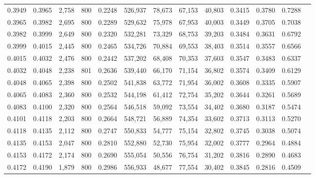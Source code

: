 \begin{tabular}{rrrrrrrrrrrrr}
0.3949 & 0.3965 &  2,758 &   800 &                                     0.2248 & 526,937 &  78,673 &  67,153 &  40,803 & 0.3415 & 0.3780 & 0.7288 \\
0.3965 & 0.3982 &  2,695 &   800 &                                     0.2289 & 529,632 &  75,978 &  67,953 &  40,003 & 0.3449 & 0.3705 & 0.7038 \\
0.3982 & 0.3999 &  2,649 &   800 &                                     0.2320 & 532,281 &  73,329 &  68,753 &  39,203 & 0.3484 & 0.3631 & 0.6792 \\
0.3999 & 0.4015 &  2,445 &   800 &                                     0.2465 & 534,726 &  70,884 &  69,553 &  38,403 & 0.3514 & 0.3557 & 0.6566 \\
0.4015 & 0.4032 &  2,476 &   800 &                                     0.2442 & 537,202 &  68,408 &  70,353 &  37,603 & 0.3547 & 0.3483 & 0.6337 \\
0.4032 & 0.4048 &  2,238 &   801 &                                     0.2636 & 539,440 &  66,170 &  71,154 &  36,802 & 0.3574 & 0.3409 & 0.6129 \\
0.4048 & 0.4065 &  2,398 &   800 &                                     0.2502 & 541,838 &  63,772 &  71,954 &  36,002 & 0.3608 & 0.3335 & 0.5907 \\
0.4065 & 0.4083 &  2,360 &   800 &                                     0.2532 & 544,198 &  61,412 &  72,754 &  35,202 & 0.3644 & 0.3261 & 0.5689 \\
0.4083 & 0.4100 &  2,320 &   800 &                                     0.2564 & 546,518 &  59,092 &  73,554 &  34,402 & 0.3680 & 0.3187 & 0.5474 \\
0.4101 & 0.4118 &  2,203 &   800 &                                     0.2664 & 548,721 &  56,889 &  74,354 &  33,602 & 0.3713 & 0.3113 & 0.5270 \\
0.4118 & 0.4135 &  2,112 &   800 &                                     0.2747 & 550,833 &  54,777 &  75,154 &  32,802 & 0.3745 & 0.3038 & 0.5074 \\
0.4135 & 0.4153 &  2,047 &   800 &                                     0.2810 & 552,880 &  52,730 &  75,954 &  32,002 & 0.3777 & 0.2964 & 0.4884 \\
0.4153 & 0.4172 &  2,174 &   800 &                                     0.2690 & 555,054 &  50,556 &  76,754 &  31,202 & 0.3816 & 0.2890 & 0.4683 \\
0.4172 & 0.4190 &  1,879 &   800 &                                     0.2986 & 556,933 &  48,677 &  77,554 &  30,402 & 0.3845 & 0.2816 & 0.4509 \\

\end{tabular}
